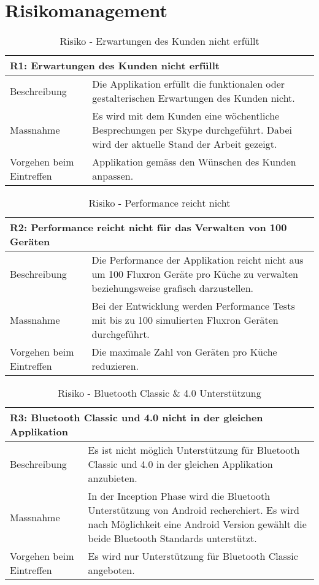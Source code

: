 
\section{Risikomanagement}
\label{sec:Risikomanagement}

\begin{table}[H]
\begin{tabularx}{\textwidth}{l|>{\raggedright\arraybackslash}X}
\multicolumn{2}{l}{\textbf{R1: Erwartungen des Kunden nicht erfüllt }} \\
\hline
Beschreibung & Die Applikation erfüllt die funktionalen oder gestalterischen Erwartungen des Kunden nicht.\\
\hline
Massnahme & Es wird mit dem Kunden eine wöchentliche Besprechungen per Skype durchgeführt. Dabei wird der aktuelle Stand der Arbeit gezeigt.\\
\hline
Vorgehen beim Eintreffen & Applikation gemäss den Wünschen des Kunden anpassen.
\\
\end{tabularx}
\caption{Risiko - Erwartungen des Kunden nicht erfüllt}
\end{table}

\begin{table}[H]
\begin{tabularx}{\textwidth}{l|>{\raggedright\arraybackslash}X}
\multicolumn{2}{l}{\textbf{R2: Performance reicht nicht für das Verwalten von 100 Geräten }} \\
\hline
Beschreibung & Die Performance der Applikation reicht nicht aus um 100 Fluxron Geräte pro Küche zu verwalten beziehungsweise grafisch darzustellen.\\
\hline
Massnahme & Bei der Entwicklung werden Performance Tests mit bis zu 100 simulierten Fluxron Geräten durchgeführt.\\
\hline
Vorgehen beim Eintreffen & Die maximale Zahl von Geräten pro Küche reduzieren.
\\
\end{tabularx}
\caption{Risiko - Performance reicht nicht}
\end{table}

\begin{table}[H]
\begin{tabularx}{\textwidth}{l|>{\raggedright\arraybackslash}X}
\multicolumn{2}{l}{\textbf{R3: Bluetooth Classic und 4.0 nicht in der gleichen Applikation }} \\
\hline
Beschreibung & Es ist nicht möglich Unterstützung für Bluetooth Classic und 4.0 in der gleichen Applikation anzubieten.\\
\hline
Massnahme & In der Inception Phase wird die Bluetooth Unterstützung von Android recherchiert. Es wird nach Möglichkeit eine Android Version gewählt die beide Bluetooth Standards unterstützt.\\
\hline
Vorgehen beim Eintreffen & Es wird nur Unterstützung für Bluetooth Classic angeboten.
\\
\end{tabularx}
\caption{Risiko - Bluetooth Classic \& 4.0 Unterstützung}
\end{table}